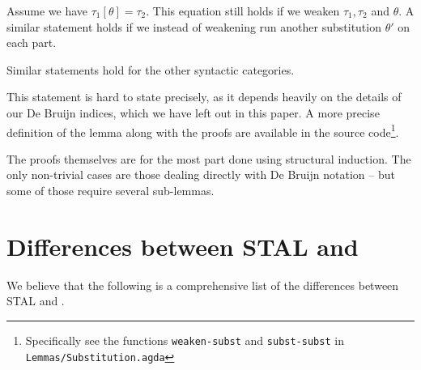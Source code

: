 \begin{lemma}
  Assume we have $\tau_1[\theta] = \tau_2$. This equation still holds if we
  weaken $\tau_1, \tau_2$ and $\theta$. A similar statement holds if we
  instead of weakening run another substitution $\theta'$ on each part.

  Similar statements hold for the other syntactic categories.
\end{lemma}

This statement is hard to state precisely, as it depends heavily on the details
of our De Bruijn indices, which we have left out in this paper. A more precise
definition of the lemma along with the proofs are available in the source
code\footnote{Specifically see the functions \texttt{weaken-subst} and
  \texttt{subst-subst} in \texttt{Lemmas/Substitution.agda}}.

The proofs themselves are for the most part done using structural induction. The
only non-trivial cases are those dealing directly with De Bruijn notation -- but
some of those require several sub-lemmas.

\section{Differences between STAL and \ATAL}
\label{sec:rel-stal}

We believe that the following is a comprehensive list of the differences between
STAL and \ATAL.

